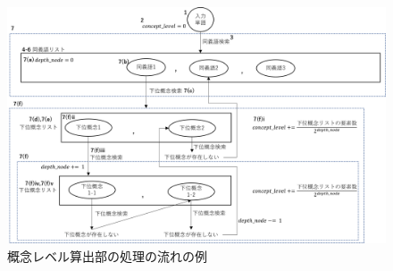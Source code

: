 \begin{figure}[t]
    \begin{center}
        \includegraphics[width=1.0\columnwidth]{image/flow_calc_concept_level.png}
        \caption{概念レベル算出部の処理の流れの例}
        \label{fig:flow_calc_concept_level}
    \end{center}
\end{figure}

